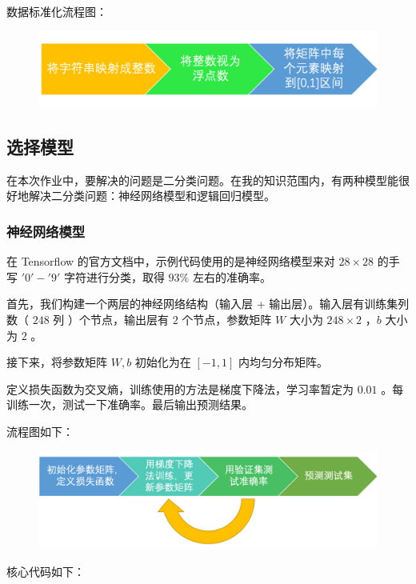 \documentclass{article}
\begin{document}
数据标准化流程图：

\begin{figure}[!h]
\centering
\includegraphics[scale=0.5]{1.png}
\end{figure}

\subsection{选择模型}

在本次作业中，要解决的问题是二分类问题。在我的知识范围内，有两种模型能很好地解决二分类问题：神经网络模型和逻辑回归模型。

\subsubsection{神经网络模型}

在 Tensorflow 的官方文档中，示例代码使用的是神经网络模型来对 $28 \times 28$ 的手写 $'0' - '9'$ 字符进行分类，取得 $93\%$ 左右的准确率。

首先，我们构建一个两层的神经网络结构（输入层 + 输出层）。输入层有训练集列数（ $248$ 列 ）个节点，输出层有 $2$ 个节点，参数矩阵 $W$ 大小为 $248 \times 2$ ，$b$ 大小为 $2$ 。

接下来，将参数矩阵 $W, b$ 初始化为在 $[-1, 1]$ 内均匀分布矩阵。

定义损失函数为交叉熵，训练使用的方法是梯度下降法，学习率暂定为 $0.01$ 。每训练一次，测试一下准确率。最后输出预测结果。

流程图如下：

\begin{figure}[!h]
\centering
\includegraphics[scale=0.5]{2.png}
\end{figure}

核心代码如下：
\end{document}
